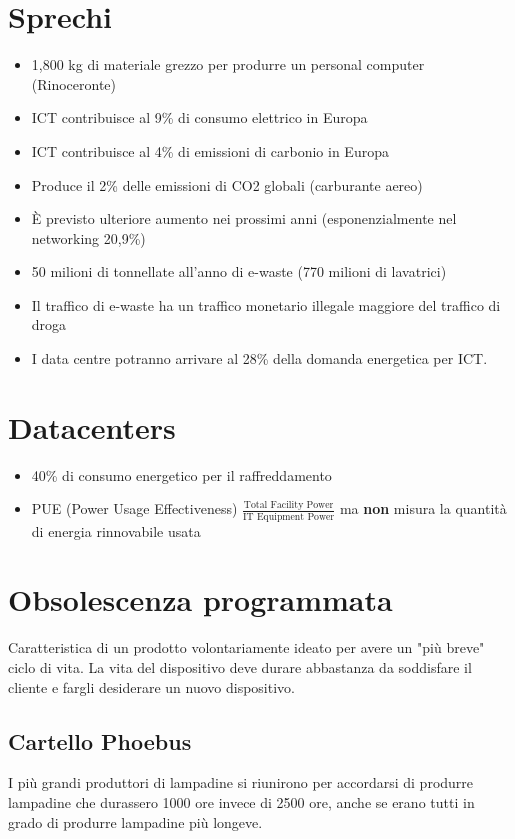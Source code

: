 \documentclass[a4paper, 12pt]{report}
\begin{document}
      \section{Sprechi}
      \begin{itemize}
        \item 1,800 kg di materiale grezzo per produrre un personal computer (Rinoceronte)
        \item ICT contribuisce al 9\% di consumo elettrico in Europa 
        \item ICT contribuisce al 4\% di emissioni di carbonio in Europa
        \item Produce il 2\% delle emissioni di CO2 globali (carburante aereo)
        \item È previsto ulteriore aumento nei prossimi anni (esponenzialmente nel networking 20,9\%) 
        \item 50 milioni di tonnellate all'anno di e-waste (770 milioni di lavatrici)
        \item Il traffico di e-waste ha un traffico monetario illegale maggiore del traffico di droga
        \item  I data centre potranno arrivare al 28\% della domanda energetica per ICT.
      \end{itemize}
      \section{Datacenters}
      \begin{itemize}
        \item 40\% di consumo energetico per il raffreddamento
        \item PUE (Power Usage Effectiveness) $\frac{\text{Total Facility Power}}{\text{IT Equipment Power}}$ ma \textbf{non} misura la quantità di energia rinnovabile usata
      \end{itemize}
      \section{Obsolescenza programmata}
      Caratteristica di un prodotto volontariamente ideato per avere un "più breve" ciclo di vita.
      La vita del dispositivo deve durare abbastanza da soddisfare il cliente e fargli desiderare un nuovo dispositivo.
      \subsection{Cartello Phoebus}
      I più grandi produttori di lampadine si riunirono per accordarsi di produrre lampadine che durassero
      1000 ore invece di 2500 ore, anche se erano tutti in grado di produrre lampadine più longeve.
\end{document}

